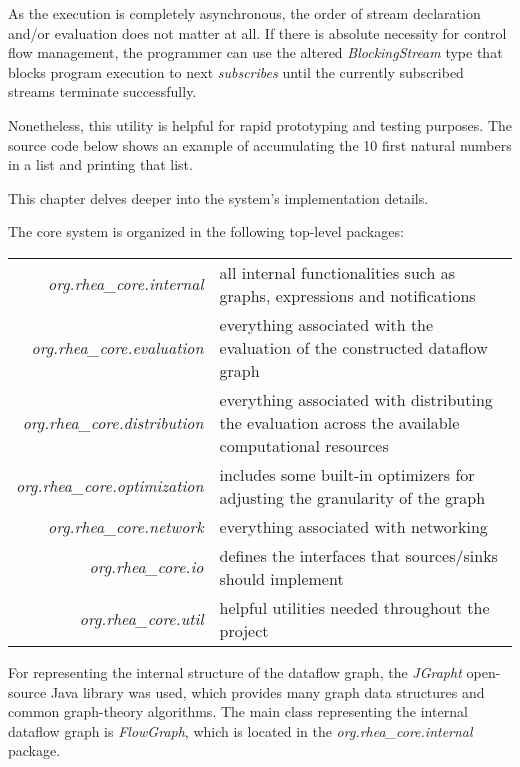 \documentclass{dithesis}
\begin{document}

As the execution is completely asynchronous, the order of stream declaration and/or evaluation does not matter at all. If there is absolute necessity for control flow management, the programmer can use the altered \textit{BlockingStream} type that blocks program execution to next \textit{subscribes} until the currently subscribed streams terminate successfully. 

Nonetheless, this utility is helpful for rapid prototyping and testing purposes. The source code below shows an example of accumulating the 10 first natural numbers in a list and printing that list. 


This chapter delves deeper into the system's implementation details. 


The core system is organized in the following top-level packages:

\begin{tabularx}{\textwidth}{rX}
	\textit{org.rhea\_core.internal} 
	& all internal functionalities such as graphs, expressions and notifications \\
	\textit{org.rhea\_core.evaluation}
	& everything associated with the evaluation of the constructed dataflow graph \\
	\textit{org.rhea\_core.distribution}
	& everything associated with distributing the evaluation across the available computational resources \\
	\textit{org.rhea\_core.optimization}	
	& includes some built-in optimizers for adjusting the  granularity of the graph \\
	\textit{org.rhea\_core.network}	
	& everything associated with networking \\
	\textit{org.rhea\_core.io}
	& defines the interfaces that sources/sinks should implement \\
	\textit{org.rhea\_core.util}
	& helpful utilities needed throughout the project \\
\end{tabularx}


For representing the internal structure of the dataflow graph, the \textit{JGrapht} open-source Java library was used, which provides many graph data structures and common graph-theory algorithms\cite{jgraph}. The main class representing the internal dataflow graph is \textit{FlowGraph},  which is located in the \textit{org.rhea\_core.internal} package.
\end{document}
